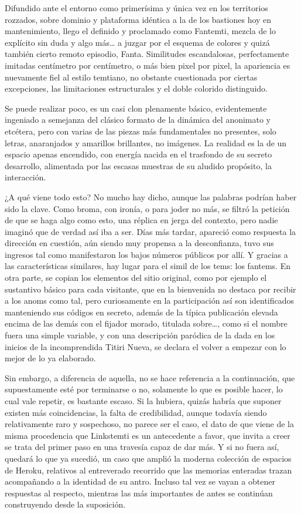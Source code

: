 \documentclass[
]{book}
\begin{document}
Difundido ante el entorno como primerísima y única vez en los territorios rozzados, sobre dominio y plataforma idéntica a la de los bastiones hoy en mantenimiento, llego el definido y proclamado como Fantemti, mezcla de lo explícito sin duda y algo más\ldots{} a juzgar por el esquema de colores y quizá también cierto remoto episodio, Fanta. Similitudes escandalosas, perfectamente imitadas centímetro por centímetro, o más bien pixel por pixel, la apariencia es nuevamente fiel al estilo temtiano, no obstante cuestionada por ciertas excepciones, las limitaciones estructurales y el doble colorido distinguido.

Se puede realizar poco, es un casi clon plenamente básico, evidentemente ingeniado a semejanza del clásico formato de la dinámica del anonimato y etcétera, pero con varias de las piezas más fundamentales no presentes, solo letras, anaranjados y amarillos brillantes, no imágenes. La realidad es la de un espacio apenas encendido, con energía nacida en el trasfondo de su secreto desarrollo, alimentada por las escasas muestras de su aludido propósito, la interacción.

¿A qué viene todo esto? No mucho hay dicho, aunque las palabras podrían haber sido la clave. Como broma, con ironía, o para joder no más, se filtró la petición de que se haga algo como esto, una réplica en jerga del contexto, pero nadie imaginó que de verdad así iba a ser. Días más tardar, apareció como respuesta la dirección en cuestión, aún siendo muy propensa a la desconfianza, tuvo sus ingresos tal como manifestaron los bajos números públicos por allí. Y gracias a las características similares, hay lugar para el simil de los tems: los fantems. En otra parte, se copian los elementos del sitio original, como por ejemplo el sustantivo básico para cada visitante, que en la bienvenida no destaca por recibir a los anoms como tal, pero curiosamente en la participación así son identificados manteniendo sus códigos en secreto, además de la típica publicación elevada encima de las demás con el fijador morado, titulada sobre\ldots, como si el nombre fuera una simple variable, y con una descripción paródica de la dada en los inicios de la incomprendida Titiri Nueva, se declara el volver a empezar con lo mejor de lo ya elaborado.

Sin embargo, a diferencia de aquella, no se hace referencia a la continuación, que supuestamente esté por terminarse o no, solamente lo que es posible hacer, lo cual vale repetir, es bastante escaso. Si la hubiera, quizás habría que suponer existen más coincidencias, la falta de credibilidad, aunque todavía siendo relativamente raro y sospechoso, no parece ser el caso, el dato de que viene de la misma procedencia que Linkstemti es un antecedente a favor, que invita a creer se trata del primer paso en una travesía capaz de dar más. Y si no fuera así, quedará lo que ya sucedió, un caso que amplió la moderna colección de espacios de Heroku, relativos al entreverado recorrido que las memorias enteradas trazan acompañando a la identidad de su antro. Incluso tal vez se vayan a obtener respuestas al respecto, mientras las más importantes de antes se continúan construyendo desde la suposición.
\end{document}
